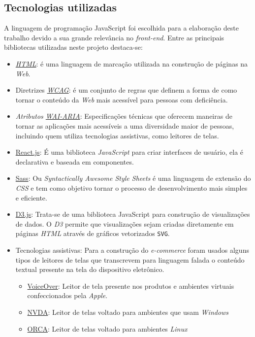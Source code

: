\subsection{Tecnologias utilizadas} 
{A linguagem de programação JavaScript foi escolhida para a elaboração deste trabalho devido a sua grande relevância no \textit{front-end}. Entre as principais bibliotecas utilizadas neste projeto destaca-se:
\begin{itemize}
\item \textit{\href{https://developer.mozilla.org/pt-BR/docs/Web/HTML}{HTML}}: é uma linguagem de marcação utilizada na construção de páginas na \textit{Web}.
\item Diretrizes \textit{\href{https://www.w3c.br/traducoes/wcag/wcag21-pt-BR/}{WCAG}}: é um conjunto de regras que definem a forma de como tornar o conteúdo da \textit{Web} mais acessível para pessoas com deficiência.
\item \textit{Atributos \href{https://www.w3.org/TR/wai-aria-1.2/}{WAI-ARIA}}: Especificações técnicas que oferecem maneiras de tornar as aplicações mais acessíveis a uma diversidade maior de pessoas, incluindo quem utiliza tecnologias assistivas, como leitores de telas.
\item { \href{https://pt-br.reactjs.org/}{React.js}}: É uma biblioteca \textit{JavaScript} para criar interfaces de usuário, ela é declarativa e baseada em componentes.
\item {\href{https://sass-lang.com/}{Sass}}: Ou \textit{Syntactically Awesome Style Sheets} é uma linguagem de extensão do \textit{CSS} e tem como objetivo tornar o processo de desenvolvimento mais simples e eficiente.
\item {\href{https://d3js.org/}{D3.js}}: Trata-se de uma biblioteca {JavaScript} para construção de visualizações de dados. O \textit{D3} permite que visualizações sejam criadas diretamente em páginas \textit{HTML} através de gráficos vetorizados \lstinline{SVG}.
\item Tecnologias assistivas: Para a construção do \textit{e-commerce} foram usados alguns tipos de leitores de telas que transcrevem para linguagem falada o conteúdo textual presente na tela do dispositivo eletrônico. 
\begin{itemize}
\item \href{https://www.apple.com/br/accessibility/vision/}{VoiceOver}: Leitor de tela presente nos produtos e ambientes virtuais confeccionados pela \textit{Apple}. 
\item \href{https://www.nvaccess.org/download/}{NVDA}: Leitor de telas voltado para ambientes que usam \textit{Windows}
\item \href{https://help.gnome.org/users/orca/stable/index.html.pt_BR}{ORCA}: Leitor de telas voltado para ambientes \textit{Linux}
\end{itemize}
\end{itemize}
 }
 

